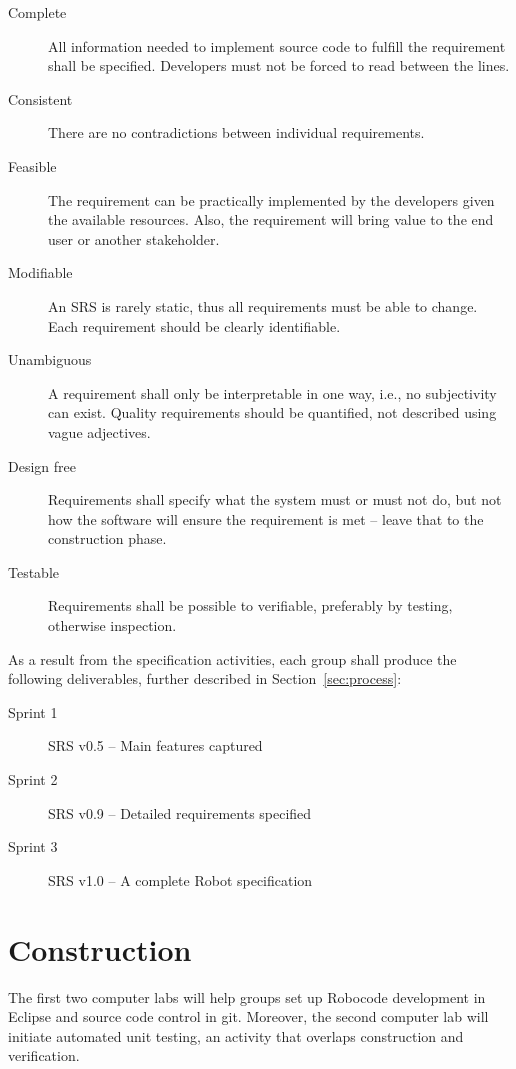 \documentclass{scrreprt}
\begin{document}
\begin{description}
\item[Complete] All information needed to implement source code to fulfill the requirement shall be specified. Developers must not be forced to read between the lines.
\item[Consistent] There are no contradictions between individual requirements.
\item[Feasible] The requirement can be practically implemented by the developers given the available resources. Also, the requirement will bring value to the end user or another stakeholder.
\item[Modifiable] An SRS is rarely static, thus all requirements must be able to change. Each requirement should be clearly identifiable.
\item[Unambiguous] A requirement shall only be interpretable in one way, i.e., no subjectivity can exist. Quality requirements should be quantified, not described using vague adjectives.
\item[Design free] Requirements shall specify what the system must or must not do, but not how the software will ensure the requirement is met -- leave that to the construction phase.
\item[Testable] Requirements shall be possible to verifiable, preferably by testing, otherwise inspection. 
\end{description}

As a result from the specification activities, each group shall produce the following deliverables, further described in Section~\ref{sec:process}:
\begin{description}
\item[Sprint 1] SRS v0.5 -- Main features captured
\item[Sprint 2] SRS v0.9 -- Detailed requirements specified
\item[Sprint 3] SRS v1.0 -- A complete Robot specification
\end{description}

\section{Construction}
The first two computer labs will help groups set up Robocode development in Eclipse and source code control in git. Moreover, the second computer lab will initiate automated unit testing, an activity that overlaps construction and verification.
\end{document}
